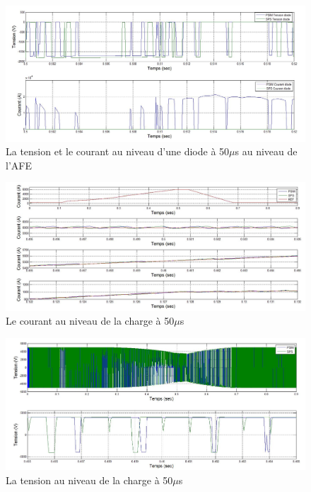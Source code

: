 \documentclass[11pt,letterpaper,final]{report}
\begin{document}
\begin{figure}[htb]
\centering
\includegraphics[scale=0.5]{Fig/DCP_AFE/50u/ten_diode_afe.jpg}
\caption{La tension et le courant au niveau d'une diode à 50$\mu$s au niveau de l'AFE}
\label{AF_DC_DI50}
\end{figure}



\begin{figure}[htb]
\centering
\includegraphics[scale=0.5]{Fig/DCP_AFE/50u/cour_ch.jpg}
\caption{Le courant au niveau de la charge à 50$\mu$s}
\label{AF_DC_CHA50}
\end{figure}

\begin{figure}[htb]
\centering
\includegraphics[scale=0.5]{Fig/DCP_AFE/50u/ten_ch.jpg}
\caption{La tension au niveau de la charge à 50$\mu$s}
\label{AF_DC_CHV50}
\end{figure}
\end{document}
